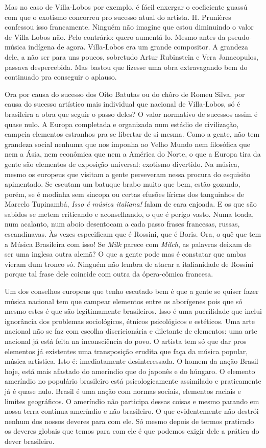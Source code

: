 Mas no caso de Villa-Lobos por exemplo, é fácil enxergar o coeficiente
guassú com que o exotismo concorreu pro sucesso atual do artista. H.
Prunières confessou isso francamente. Ninguém não imagine que estou
diminuindo o valor de Villa-Lobos não. Pelo contrário: quero aumentá-lo.
Mesmo antes da pseudo-música indígena de agora. Villa-Lobos era um
grande compositor. A grandeza dele, a não ser para uns poucos, sobretudo
Artur Rubinstein e Vera Janacopulos, passava despercebida. Mas bastou
que fizesse uma obra extravagando bem do continuado pra conseguir o
aplauso.

Ora por causa do sucesso dos Oito Batutas ou do chôro de Romeu Silva,
por causa do sucesso artístico mais individual que nacional de
Villa-Lobos, só é brasileira a obra que seguir o passo deles? O valor
normativo de sucessos assim é quase nulo. A Europa completada e
organizada num estádio de civilização, campeia elementos estranhos pra
se libertar de si mesma. Como a gente, não tem grandeza social nenhuma
que nos imponha ao Velho Mundo nem filosófica que nem a Ásia, nem
econômica que nem a América do Norte, o que a Europa tira da gente são
elementos de exposição universal: exotismo divertido. Na música, mesmo
os europeus que visitam a gente perseveram nessa procura do esquisito
apimentado. Se escutam um batuque brabo muito que bem, estão gozando,
porém, se é modinha sem sincopa ou certas efusões líricas dos tanguinhos
de Marcelo Tupinambá, \emph{Isso é música italiana!} falam de cara
enjoada. E os que são sabidos se metem criticando e aconselhando, o que
é perigo vasto. Numa toada, num acalanto, num aboio desentocam a cada
passo frases francesas, russas, escandinavas. Às vezes especificam que é
Rossini, que é Boris. Ora, o quê que tem a Música Brasileira com isso!
Se \emph{Milk} parece com \emph{Milch}, as palavras deixam de ser uma
inglesa outra alemã? O que a gente pode mas é constatar que ambas vieram
dum tronco só. Ninguém não lembra de atacar a italianidade de Rossini
porque tal frase dele coincide com outra da ópera-cômica francesa.

Um dos conselhos europeus que tenho escutado bem é que a gente se quiser
fazer música nacional tem que campear elementos entre os aborígenes pois
que só mesmo estes é que são legitimamente brasileiros. Isso é uma
puerilidade que inclui ignorância dos problemas sociológicos, étnicos
psicológicos e estéticos. Uma arte nacional não se faz com escolha
discricionária e diletante de elementos: uma arte nacional já está feita
na inconsciência do povo. O artista tem só que dar pros elementos já
existentes uma transposição erudita que faça da música popular, música
artística. Isto é: imediatamente desinteressada. O homem da nação Brasil
hoje, está mais afastado do ameríndio que do japonês e do húngaro. O
elemento ameríndio no populário brasileiro está psicologicamente
assimilado e praticamente já é quase nulo. Brasil é uma nação com normas
sociais, elementos raciais e limites geográficos. O ameríndio não
participa dessas coisas e mesmo parando em nossa terra continua
ameríndio e não brasileiro. O que evidentemente não destrói nenhum dos
nossos deveres para com ele. Só mesmo depois de termos praticado os
deveres globais que temos para com ele é que podemos exigir dele a
prática do dever brasileiro.

